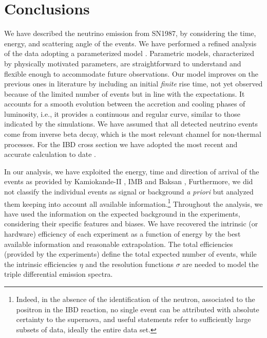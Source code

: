 \documentclass[a4paper,11pt]{article}
\begin{document}
 
\section{Conclusions}






We have  
described the 
 neutrino emission from SN1987, by considering the time, energy, and scattering angle of the events.  We have performed a refined analysis of the data adopting a parameterized model  \cite{sym13101851}.
Parametric models, characterized by physically motivated parameters, are straightforward to understand and flexible enough to accommodate future observations. 
Our model improves on the previous ones in literature by including  an  initial {\em finite} rise time, not yet observed because of the limited number of events but in line  with the expectations.
It accounts for a smooth  evolution between the accretion and cooling phases of luminosity, i.e., it provides a continuous and regular curve, similar to those indicated by the simulations.
We  have assumed that all detected neutrino events come from inverse beta decay, which is the most relevant channel for non-thermal processes.
For the IBD cross section we have adopted the most recent and accurate calculation to date \cite{Ricciardi:2022pru}. 


In our analysis, we have exploited the energy, time and direction of arrival of the events as provided  by Kamiokande-II \cite{hirataPhysRevLett.58.1490,PhysRevD.38.448},  IMB \cite{PhysRevLett.58.1494,PhysRevD.37.3361} and  Baksan \cite{ALEXEYEV1988209}, Furthermore, we did not classify the individual events as signal or background {\em a priori} but analyzed them keeping into account all available information.\footnote{Indeed, in the absence of the identification of the  neutron, associated to the positron in the IBD reaction, no single event can be attributed with absolute certainty to the supernova, and useful statements refer to sufficiently large subsets of data, ideally the entire data set.} Throughout the analysis, we  have used the information on the  expected background in the experiments, considering their specific  features and biases.
We have recovered 
 the intrinsic (or hardware) efficiency of each experiment as a function of energy by the best available information and reasonable extrapolation. 
The total efficiencies (provided by the experiments) define the total expected number of events, while the intrinsic efficiencies $\eta$  and the resolution functions $\sigma$
are needed to model the triple differential emission spectra.
%
\end{document}
